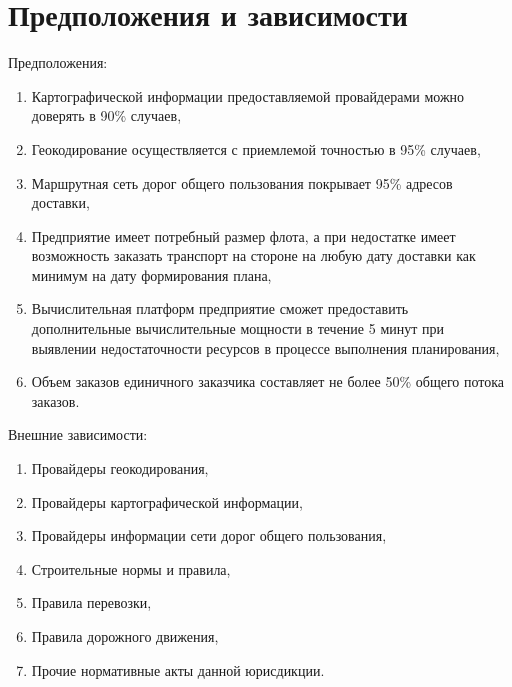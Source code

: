 \section{Предположения и зависимости}
\label{sec:dep}

Предположения:
\begin{enumerate}[label=ASM-\arabic*]
    \item Картографической информации предоставляемой провайдерами можно доверять в 90\% случаев,
    \item Геокодирование осуществляется с приемлемой точностью в 95\% случаев,
    \item Маршрутная сеть дорог общего пользования покрывает 95\% адресов доставки,
    \item Предприятие имеет потребный размер флота, а при недостатке имеет возможность заказать транспорт на стороне на любую дату доставки как минимум на дату формирования плана,
    \item Вычислительная платформ предприятие сможет предоставить дополнительные вычислительные мощности в течение 5 минут при выявлении недостаточности ресурсов в процессе выполнения планирования,
    \item Объем заказов единичного заказчика составляет не более 50\% общего потока заказов.
\end{enumerate}

Внешние зависимости:
\begin{enumerate}[label=DEP-\arabic*]
    \item Провайдеры геокодирования,
    \item Провайдеры картографической информации,
    \item Провайдеры информации сети дорог общего пользования,
    \item Строительные нормы и правила,
    \item Правила перевозки,
    \item Правила дорожного движения,
    \item Прочие нормативные акты данной юрисдикции.
\end{enumerate}

\endinput
